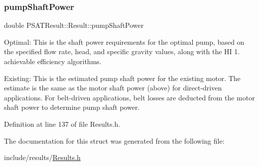 \subsubsection{\texorpdfstring{pump\+Shaft\+Power}{pumpShaftPower}}
{\footnotesize\ttfamily double P\+S\+A\+T\+Result\+::\+Result\+::pump\+Shaft\+Power}



Optimal\+: This is the shaft power requirements for the optimal pump, based on the specified flow rate, head, and specific gravity values, along with the HI 1. achievable efficiency algorithms. 

Existing\+: This is the estimated pump shaft power for the existing motor. The estimate is the same as the motor shaft power (above) for direct-\/driven applications. For belt-\/driven applications, belt losses are deducted from the motor shaft power to determine pump shaft power. 

Definition at line 137 of file Results.\+h.



The documentation for this struct was generated from the following file\+:\begin{DoxyCompactItemize}
\item 
include/results/\hyperlink{_results_8h}{Results.\+h}\end{DoxyCompactItemize}
